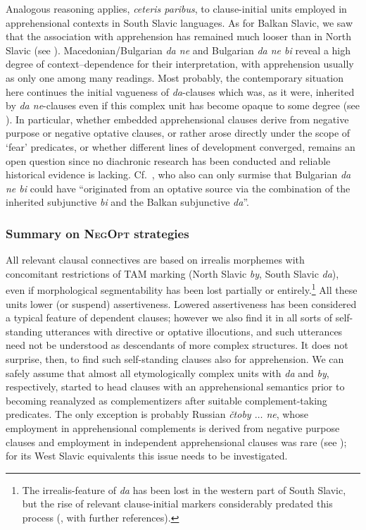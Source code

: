\documentclass[output=paper,colorlinks,citecolor=brown]{langscibook}
\begin{document}
Analogous reasoning applies, \textit{ceteris paribus}, to clause-initial units employed in apprehensional contexts in South Slavic languages. As for Balkan Slavic, we saw that the association with apprehension has remained much looser than in North Slavic (see ). Macedonian/Bulgarian \textit{da ne} and Bulgarian \textit{da ne bi} reveal a high degree of context--dependence for their interpretation, with apprehension  usually as only one among many readings. Most probably, the contemporary situation here continues the initial vagueness of \textit{da}-clauses which was, as it were, inherited by \textit{da ne}-clauses even if this complex unit has become opaque to some degree (see ). In particular, whether embedded apprehensional clauses derive from negative purpose or negative optative clauses, or rather arose directly under the scope of `fear' predicates, or whether different lines of development converged, remains an open question since no diachronic research has been conducted and reliable historical evidence is lacking. Cf.\ \citet[76--77]{MitkovskaEtAl2017}, who also can only surmise that Bulgarian \textit{da ne bi} could have ``originated from an optative source via the combination of the inherited subjunctive \textit{bi} and the Balkan subjunctive \textit{da}''.


\subsubsection{Summary on \textsc{NegOpt} strategies}
\label{subsubsec:summarynegopt}


All relevant clausal connectives are based on irrealis morphemes with concomitant restrictions of TAM marking (North Slavic \textit{by}, South Slavic \textit{da}), even if morphological segmentability has been lost partially or entirely.\footnote{The irrealis-feature of \textit{da} has been lost in the western part of South Slavic, but the rise of relevant clause-initial markers considerably predated this process (\citealt[295--303]{Wiemer2018}, with further references).} All these units lower (or suspend) assertiveness. Lowered assertiveness has been considered a typical feature of dependent clauses; however we also find it in all sorts of self-standing utterances with directive or optative illocutions, and such utterances need not be understood as descendants of more complex structures. It does not surprise, then, to find such self-standing clauses also for apprehension. We can safely assume that almost all etymologically complex units with \textit{da} and \textit{by}, respectively, started to head clauses with an apprehensional semantics prior to becoming reanalyzed as complementizers after suitable complement-taking predicates. The only exception is probably Russian \textit{čtoby $\ldots$  ne}, whose employment in apprehensional complements is derived from negative purpose clauses and employment in independent apprehensional clauses was rare (see ); for its West Slavic equivalents this issue needs to be investigated.
\end{document}
